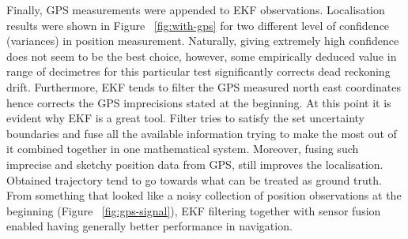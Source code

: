 \begin{figure}%
  \centering
\end{figure}
Finally, GPS measurements were appended to EKF observations. Localisation results were shown in Figure ~\ref{fig:with-gps} for two different level of confidence (variances) in position measurement. Naturally, giving extremely high confidence does not seem to be the best choice, however, some empirically deduced value in range of decimetres for this particular test significantly corrects dead reckoning drift. Furthermore, EKF tends to filter the GPS measured north east coordinates hence corrects the GPS imprecisions stated at the beginning. At this point it is evident why EKF is a great tool. Filter tries to satisfy the set uncertainty boundaries and fuse all the available information trying to make the most out of it combined together in one mathematical system. Moreover, fusing such imprecise and sketchy position data from GPS, still improves the localisation. Obtained trajectory tend to go towards what can be treated as ground truth. From something that looked like a noisy collection of position observations at the beginning (Figure ~\ref{fig:gps-signal}), EKF filtering together with sensor fusion enabled  having generally better performance in navigation.     
